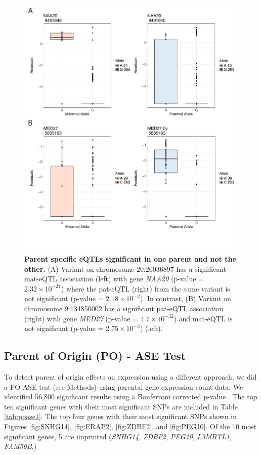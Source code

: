 \begin{figure}[!htb]
\centering \includegraphics[width=5in]{img/ch04/fig-07-sig_notsig.pdf}
\caption[Parent specific eQTLs significant in one parent and not the other.]{\textbf{Parent specific eQTLs significant in one parent and not the other.} (A) Variant on chromosome 20:20036897 has a significant mat-eQTL association (left) with gene \emph{NAA20} (p-value = $2.32 \times 10^{-27} $) where the pat-eQTL (right) from the same variant is not significant (p-value = $2.18 \times 10^{-2} $). In contrast, (B) Variant on chromosome 9:134850002 has a significant pat-eQTL association (right) with gene \emph{MED27} (p-value = $4.7 \times 10^{-32} $) and mat-eQTL is not significant (p-value = $2.75 \times 10^{-3} $) (left).}
\label{fig:sig_notsig}
\end{figure}


\subsection{Parent of Origin (PO) - ASE Test}\label{Parent of Origin (PO) - ASE Test} 

To detect parent of origin effects on expression using a different approach, we did a PO ASE test (see Methods) using parental gene expression count data. We identified 56,800 significant results using a Bonferroni corrected p-value . The top ten significant genes with their most significant SNPs are included in Table \ref{tab:poase1}. The top four genes with their most significant SNPs shown in Figures \ref{fig:SNHG14}, \ref{fig:ERAP2}, \ref{fig:ZDBF2}, and \ref{fig:PEG10}. Of the 10 most significant genes, 5 are imprinted (\emph{SNHG14}, \emph{ZDBF2}, \emph{PEG10}, \emph{L3MBTL1}, \emph{FAM50B}.)

